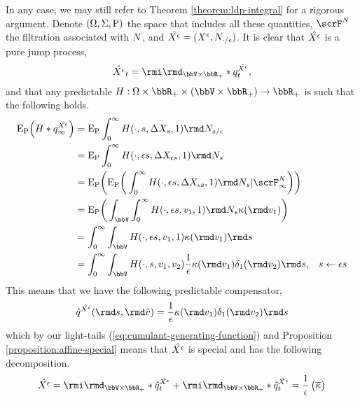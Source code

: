 \begin{example}
  In any case, we may still refer to Theorem \ref{theorem:ldp-integral} for a rigorous argument.
  Denote $(\Omega, \Sigma, {\operatorname{P}})$ the space that includes all these quantities, $\scrF^\N$ the filtration associated with $N$, and $\hat{X^\epsilon} = (X^\epsilon, N_{\cdot/\epsilon})$.
  It is clear that $\hat{X^\epsilon}$ is a pure jump process,
  \begin{equation*}
    \hat\Xee_t = \id_{\vecSpace\times\bbR_+} \ast \jumpMeas^{\hat\Xee}_t,
  \end{equation*}
  and that any predictable $H: \Omega \times \bbR_+ \times (\vecSpace \times \bbR_+) \rightarrow \bbR_+$ is such that the following holds.
  \begin{align*}
    \Exp_\Prb \Big( H \ast \jumpMeas^{\hat\Xee}_\infty \Big)
    &= \Exp_\Prb \int_0^\infty H(\cdot, s, \Delta \X_s, 1) \rmd\N_{s/\epsilon}  \\
    &= \Exp_\Prb \int_0^\infty H(\cdot, \epsilon s, \Delta \X_{\epsilon s}, 1) \rmd\N_s  \\
    &= \Exp_\Prb \bigg( \Exp_\Prb \bigg( \int_0^\infty H(\cdot, \epsilon s, \Delta\X_{\epsilon s}, 1) \rmd\N_s  | \scrF^N_\infty \bigg) \bigg) \\
    &= \Exp_\Prb \bigg( \int_\vecSpace\int_0^\infty H(\cdot, \epsilon s, \markVar_1, 1) \rmd\N_s \affDist(\rmd\markVar_1) \bigg) \\
    &= \int_0^\infty \int_\vecSpace H(\cdot, \epsilon s, \markVar_1, 1) \affDist(\rmd\markVar_1)  \rmd s \\
    &= \int_0^\infty \int_\vecSpace H(\cdot, s, \markVar_1, \markVar_2) \frac1\epsilon \affDist(\rmd\markVar_1) \delta_1(\rmd\markVar_2) \rmd s, & s \leftarrow \epsilon s
  \end{align*}
  This means that we have the following predictable compensator,
  \begin{equation*}
    \predproj{\jumpMeas^{\hat\Xee}}(\rmd s, \rmd\hat\markVar) = \frac1\epsilon \affDist(\rmd\markVar_1) \delta_1(\rmd\markVar_2)\rmd s
  \end{equation*}
  which by our light-tails (\ref{eq:cumulant-generating-function}) and Proposition \ref{proposition:affine-special} means that $\hat{X^\epsilon}$ is special and has the following decomposition.
  \begin{equation*}
    \hat\Xee
    = \id_{\vecSpace\times\bbR_+} \ast \predproj{\jumpMeas^{\hat\Xee}}_t + \id_{\vecSpace\times\bbR_+} \ast \compensate{\jumpMeas^{\hat\Xee}}_t 
    = \frac1\epsilon\begin{pmatrix} 
      \overline\affDist \\

\end{pmatrix}
\end{equation*}
\end{example}
